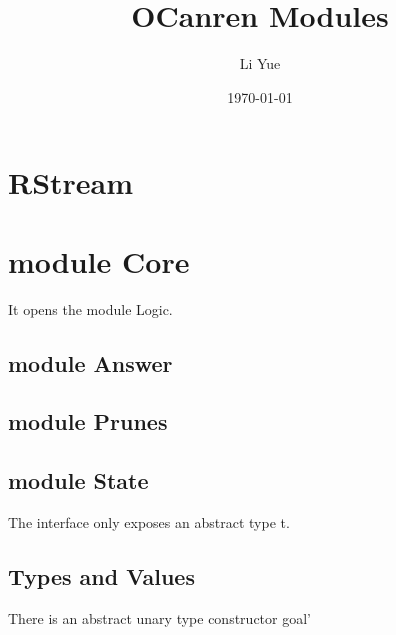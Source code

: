 \documentclass[12pt]{article}
\title{OCanren Modules}
\author{Li Yue}
\date{\today}
\begin{document}
\maketitle
\tableofcontents

\section{RStream}

\section{module Core}
It opens the module Logic.
\subsection{module Answer}
\subsection{module Prunes}
\subsection{module State}
The interface only exposes an abstract type t.
\subsection{Types and Values}
There is an abstract unary type constructor goal'
\end{document}
